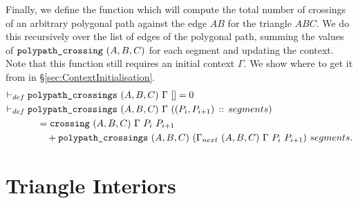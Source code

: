 Finally, we define the function which will compute the total number of crossings of an arbitrary polygonal path against the edge $AB$ for the triangle $ABC$. We do this recursively over the list of edges of the polygonal path, summing the values of $\texttt{polypath\_crossing}\ (A,B,C)$ for each segment and updating the context. Note that this function still requires an initial context $\Gamma$. We show where to get it from in \S\ref{sec:ContextInitialisation}.
\begin{equation*}
\begin{aligned}
\vdash_{def}\;&\texttt{polypath\_crossings}\ (A,B,C)\ \Gamma\ [] = 0\\
\vdash_{def}\;&\texttt{polypath\_crossings}\ (A,B,C)\ \Gamma\ ((P_i,P_{i+1})\,::\,segments)\\
 &\quad= \texttt{crossing}\ (A,B,C)\ \Gamma\ P_i\ P_{i+1}\\
 &\qquad+ \texttt{polypath\_crossings}\ (A,B,C)\ (\Gamma_{next}\ (A,B,C)\ \Gamma\ P_i\ P_{i+1})\ segments.
\end{aligned}
\end{equation*}


\section{Triangle Interiors}\label{sec:TriangleInteriorDefinition}

